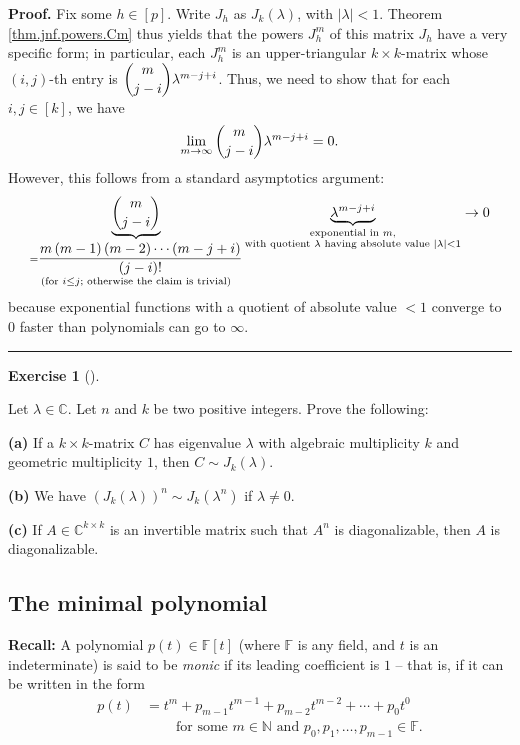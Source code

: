 \documentclass[numbers=enddot,12pt,final,onecolumn,notitlepage]{scrartcl}%
\newcounter{exer}
\numberwithin{exer}{subsection}
\theoremstyle{definition}
\newtheorem{exmp}[exer]{Exercise}
\newenvironment{exercise}[1][]
{\begin{exmp}[#1]\begin{leftbar}}
{\end{leftbar}\end{exmp}}
\newenvironment{proof}[1][Proof]{\noindent\textbf{#1.} }{\ \rule{0.5em}{0.5em}}
\begin{document}
\begin{proof}
Fix some $h\in\left[  p\right]  $. Write $J_{h}$ as $J_{k}\left(
\lambda\right)  $, with $\left\vert \lambda\right\vert <1$. Theorem
\ref{thm.jnf.powers.Cm} thus yields that the powers $J_{h}^{m}$ of this matrix
$J_{h}$ have a very specific form; in particular, each $J_{h}^{m}$ is an
upper-triangular $k\times k$-matrix whose $\left(  i,j\right)  $-th entry is
$\dbinom{m}{j-i}\lambda^{m-j+i}$. Thus, we need to show that for each
$i,j\in\left[  k\right]  $, we have%
\[
\lim\limits_{m\rightarrow\infty}\dbinom{m}{j-i}\lambda^{m-j+i}=0.
\]
However, this follows from a standard asymptotics argument:%
\[
\underbrace{\dbinom{m}{j-i}}_{\substack{=\dfrac{m\left(  m-1\right)  \left(
m-2\right)  \cdots\left(  m-j+i\right)  }{\left(  j-i\right)  !}\\\text{(for
}i\leq j\text{; otherwise the claim is trivial)}}}\underbrace{\lambda^{m-j+i}%
}_{\substack{\text{exponential in }m\text{,}\\\text{with quotient }%
\lambda\text{ having absolute value }\left\vert \lambda\right\vert
<1}}\rightarrow0
\]
because exponential functions with a quotient of absolute value $<1$ converge
to $0$ faster than polynomials can go to $\infty$.
\end{proof}

\begin{exercise}
 Let $\lambda\in\mathbb{C}$. Let $n$ and $k$ be two positive integers.
Prove the following: \medskip

\textbf{(a)} If a $k\times k$-matrix $C$ has eigenvalue $\lambda$ with
algebraic multiplicity $k$ and geometric multiplicity $1$, then $C\sim
J_{k}\left(  \lambda\right)  $. \medskip

\textbf{(b)} We have $\left(  J_{k}\left(  \lambda\right)  \right)  ^{n}\sim
J_{k}\left(  \lambda^{n}\right)  $ if $\lambda\neq0$. \medskip

\textbf{(c)} If $A\in\mathbb{C}^{k\times k}$ is an invertible matrix such that
$A^{n}$ is diagonalizable, then $A$ is diagonalizable.
\end{exercise}

\subsection{The minimal polynomial}

\textbf{Recall:} A polynomial $p\left(  t\right)  \in\mathbb{F}\left[
t\right]  $ (where $\mathbb{F}$ is any field, and $t$ is an indeterminate) is
said to be \emph{monic} if its leading coefficient is $1$ -- that is, if it
can be written in the form%
\begin{align*}
p\left(  t\right)   &  =t^{m}+p_{m-1}t^{m-1}+p_{m-2}t^{m-2}+\cdots+p_{0}%
t^{0}\\
&  \ \ \ \ \ \ \ \ \ \ \text{for some }m\in\mathbb{N}\text{ and }p_{0}%
,p_{1},\ldots,p_{m-1}\in\mathbb{F}.
\end{align*}
\end{document}

